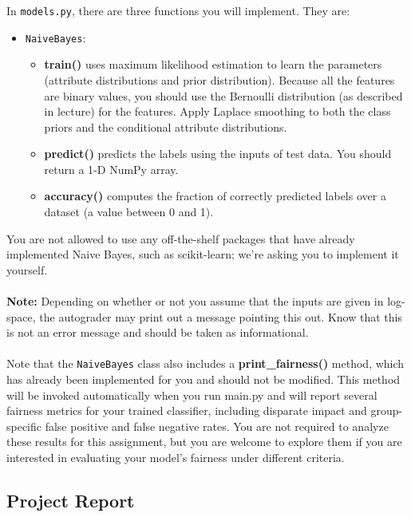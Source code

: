 \documentclass{article}
\begin{document}
In \texttt{models.py}, there are three functions you will implement. They are:

\begin{itemize}
\item \texttt{NaiveBayes}:
\begin{itemize}
	\item[\textendash] {\bf train()} uses maximum likelihood estimation to learn the parameters (attribute distributions and prior distribution). Because all the features are binary values, you should use the Bernoulli distribution (as described in lecture) for the features. Apply Laplace smoothing to both the class priors and the conditional attribute distributions. 
	\item[\textendash] {\bf predict()} predicts the labels using the inputs of test data. You should return a 1-D NumPy array.
	\item[\textendash] {\bf accuracy()} computes the fraction of correctly predicted labels over a dataset (a value between 0 and 1).
\end{itemize}
\end{itemize}


You are not allowed to use any off-the-shelf packages that have already implemented Naive Bayes, such as scikit-learn; we're asking you to implement it yourself.
\\\\
\textbf{Note:} Depending on whether or not you assume that the inputs
are given in log-space, the autograder may print out a message
pointing this out. Know that this is not an error message and
should be taken as informational.
\\\\
Note that the \texttt{NaiveBayes} class also includes a {\bf print\_fairness()} method, which has already been implemented for you and should not be modified. This method will be invoked automatically when you run main.py and will report several fairness metrics for your trained classifier, including disparate impact and group-specific false positive and false negative rates. You are not required to analyze these results for this assignment, but you are welcome to explore them if you are interested in evaluating your model's fairness under different criteria.


\subsection*{Project Report}
\end{document}
